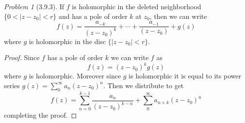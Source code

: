 \documentclass[10pt]{article}
\newcommand{\sk}{\vskip 10mm}
\theoremstyle{remark}
\newtheorem{problem}{Problem}
\theoremstyle{remark}
\begin{document}
\sk

\begin{problem}[3.9.3]
  If $f$ is holomorphic in the deleted neighborhood $\{0<|z-z_0|<r\}$ and has a
  pole of order $k$ at $z_0$, then we can write
  \[
    f(z)=\frac{a_{-k}}{(z-z_0)^k}+\cdots + \frac{a_{-1}}{(z-z_0)} +g(z)
  \]
  where $g$ is holomorphic in the disc $\{|z-z_0|<r\}$.
\end{problem}

\begin{proof}
  Since $f$ has a pole of order $k$ we can write $f$ as
  \[
    f(z)=(z-z_0)^k g(z)
  \]
  where $g$ is holomorphic. Moreover since $g$ is holomorphic it is equal
  to its power series $g(z)=\sum_0^\infty a_n(z-z_0)^n$. Then we distribute to get
  \[
    f(z)=\sum_{n=0}^{k-1}\frac{a_n}{(z-z_0)^{k-n}}+\sum_0^\infty a_{n+k}(z-z_0)^n
  \]
  completing the proof.
\end{proof}

\end{document}
